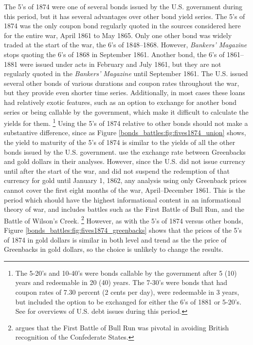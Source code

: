 The 5's of 1874 were one of several bonds issued by the U.S. government during this period, but it has several advantages over other bond yield series.
The 5's of 1874 was the only coupon bond regularly quoted in the sources considered here for the entire war, April 1861 to May 1865.
Only one other bond was widely traded at the start of the war, the 6's of 1848--1868.
However, \textit{Bankers' Magazine} stops quoting the 6's of 1868 in September 1861.
Another bond, the  6's of 1861--1881 were issued under acts in February and July 1861, but they are not regularly quoted in the \textit{Bankers' Magazine} until September 1861.
The U.S. issued several other bonds of various durations and coupon rates throughout the war, but they provide even shorter time series.
Additionally, in most cases these loans had relatively exotic features, such as an option to exchange for another bond series or being callable by the government, which make it difficult to calculate the yields for them.
\footnote{
  The 5-20's and 10-40's were bonds callable by the government after 5 (10) years and redeemable in 20 (40) years.
  The 7-30's were bonds that had coupon rates of 7.30 percent (2 cents per day), were redeemable in 3 years, but included the option to be exchanged for either the 6's of 1881 or 5-20's.
  See \textcites{Bayley1882}{DeKnight1900}[297--309]{HomerSylla2005} for overviews of U.S. debt issues during this period.
}
Using the 5's of 1874 relative to other bonds should not make a substantive difference, since as Figure \ref{bonds_battles:fig:fives1874_union} shows, the yield to maturity of the 5's of 1874 is similar to the yields of all the other bonds issued by the U.S. government.
\textcites{WillardGuinnaneEtAl1996}{McCandless1996}{SmithSmith1997} use the exchange rate between Greenbacks and gold dollars in their analyses.
However, since the U.S. did not issue currency until after the start of the war, and did not suspend the redemption of that currency for gold until January 1, 1862, any analysis using only Greenback prices cannot cover the first eight months of the war, April--December 1861.
This is the period which should have the highest informational content in an informational theory of war, and includes battles such as the First Battle of Bull Run, and the Battle of Wilson's Creek.%
\footnote{\textcite{Poast2012} argues that the First Battle of Bull Run was pivotal in avoiding British recognition of the Confederate States.}
However, as with the 5's of 1874 versus other bonds,  Figure \ref{bonds_battles:fig:fives1874_greenbacks} shows that the prices of the 5's of 1874 in gold dollars is similar in both level and trend as the the price of Greenbacks in gold dollars, so the choice is unlikely to change the results.

